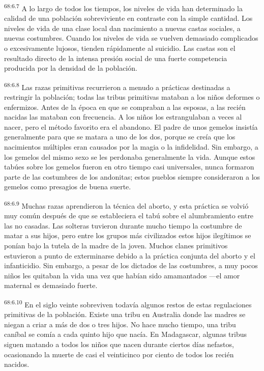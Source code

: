 \documentclass[twoside, 11pt]{book}
\begin{document}
\par
\textsuperscript{68:6.7} A lo largo de todos los tiempos, los niveles de vida han determinado la calidad de una población sobreviviente en contraste con la simple cantidad. Los niveles de vida de una clase local dan nacimiento a nuevas castas sociales, a nuevas costumbres. Cuando los niveles de vida se vuelven demasiado complicados o excesivamente lujosos, tienden rápidamente al suicidio. Las castas son el resultado directo de la intensa presión social de una fuerte competencia producida por la densidad de la población.

\par
\textsuperscript{68:6.8} Las razas primitivas recurrieron a menudo a prácticas destinadas a restringir la población; todas las tribus primitivas mataban a los niños deformes o enfermizos. Antes de la época en que se compraban a las esposas, a las recién nacidas las mataban con frecuencia. A los niños los estrangulaban a veces al nacer, pero el método favorito era el abandono. El padre de unos gemelos insistía generalmente para que se matara a uno de los dos, porque se creía que los nacimientos múltiples eran causados por la magia o la infidelidad. Sin embargo, a los gemelos del mismo sexo se les perdonaba generalmente la vida. Aunque estos tabúes sobre los gemelos fueron en otro tiempo casi universales, nunca formaron parte de las costumbres de los andonitas; estos pueblos siempre consideraron a los gemelos como presagios de buena suerte.

\par
\textsuperscript{68:6.9} Muchas razas aprendieron la técnica del aborto, y esta práctica se volvió muy común después de que se estableciera el tabú sobre el alumbramiento entre las no casadas. Las solteras tuvieron durante mucho tiempo la costumbre de matar a sus hijos, pero entre los grupos más civilizados estos hijos ilegítimos se ponían bajo la tutela de la madre de la joven. Muchos clanes primitivos estuvieron a punto de exterminarse debido a la práctica conjunta del aborto y el infanticidio. Sin embargo, a pesar de los dictados de las costumbres, a muy pocos niños les quitaban la vida una vez que habían sido amamantados ---el amor maternal es demasiado fuerte.

\par
\textsuperscript{68:6.10} En el siglo veinte sobreviven todavía algunos restos de estas regulaciones primitivas de la población. Existe una tribu en Australia donde las madres se niegan a criar a más de dos o tres hijos. No hace mucho tiempo, una tribu caníbal se comía a cada quinto hijo que nacía. En Madagascar, algunas tribus siguen matando a todos los niños que nacen durante ciertos días nefastos, ocasionando la muerte de casi el veinticinco por ciento de todos los recién nacidos.
\end{document}
